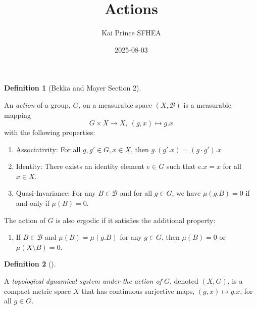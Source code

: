 \documentclass[
  british,
]{article}
\title{Actions}
\author{Kai Prince SFHEA}
\date{2025-08-03}
\providecommand{\tightlist}{%
  \setlength{\itemsep}{0pt}\setlength{\parskip}{0pt}}
\renewcommand*\contentsname{Table of contents}
\newcommand\contentsname{Table of contents}
\theoremstyle{definition}
\newtheorem{definition}{Definition}[section]
\theoremstyle{remark}
\newcommand{\GroupOperation}[2]{{#1}\cdot{#2}}
\newcommand{\GroupIdentity}{{e}}
\newcommand{\GroupElement}{{g}}
\newcommand{\Group}{{G}}
\newcommand{\Measure}{{\mu}}
\newcommand{\GroupAction}[2]{{#1}.{#2}}
\newcommand{\SigmaAlgebra}[1]{{\mathscr{#1}}}
\begin{document}
\maketitle

\renewcommand*\contentsname{Table of contents}
{
\hypersetup{linkcolor=}
\setcounter{tocdepth}{3}
\tableofcontents
}

\begin{definition}[Bekka and Mayer
 Section
2]\protect\hypertarget{def-action}{}\label{def-action}

An \emph{action} of a group, \(\Group\), on a measurable space
\((X,\SigmaAlgebra{B})\) is a measurable mapping
\[\Group\times X\rightarrow X,\ (\GroupElement,x)\mapsto \GroupAction{\GroupElement}{x} \]
with the following properties:

\begin{enumerate}
\def\labelenumi{\arabic{enumi}.}
\tightlist
\item
  Associativity: For all
  \(\GroupElement,\GroupElement'\in \Group,x\in X\), then
  \(\GroupAction{\GroupElement}{(\GroupAction{\GroupElement'}{x})}=\GroupAction{(\GroupOperation{\GroupElement}{\GroupElement'})}{x}\)
\item
  Identity: There exists an identity element \(\GroupIdentity\in\Group\)
  such that \(\GroupAction{\GroupIdentity}{x}=x\) for all \(x\in X\).
\item
  Quasi-Invariance: For any \(B\in\SigmaAlgebra{B}\) and for all
  \(\GroupElement\in\Group\), we have
  \(\Measure(\GroupAction{\GroupElement}{B})=0\) if and only if
  \(\Measure(B)=0\).
\end{enumerate}

The action of \(\Group\) is also ergodic if it satisfies the additional
property:

\begin{enumerate}
\def\labelenumi{\arabic{enumi}.}
\setcounter{enumi}{3}
\tightlist
\item
  If \(B\in\SigmaAlgebra{B}\) and
  \(\Measure(B)=\Measure(\GroupAction{\GroupElement}{B})\) for any
  \(\GroupElement\in\Group\), then \(\Measure(B)=0\) or
  \(\Measure(X\setminus B)=0\).
\end{enumerate}

\end{definition}

\begin{definition}[]\protect\hypertarget{def-topologicalDynamicalSystem}{}\label{def-topologicalDynamicalSystem}

A \emph{topological dynamical system under the action of \(\Group\)},
denoted \((X,\Group)\), is a compact metric space \(X\) that has
continuous surjective maps,
\((\GroupElement,x)\mapsto \GroupAction{\GroupElement}{x}\), for all
\(\GroupElement\in\Group\).

\end{definition}
\end{document}
